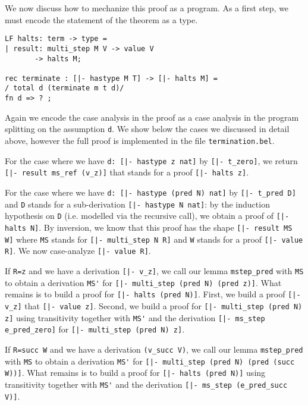 We now discuss how to mechanize this proof as a program. As a first step, we
must encode the statement of the theorem as a type.

\begin{lstlisting}
LF halts: term -> type =
| result: multi_step M V -> value V
       -> halts M;

rec terminate : [|- hastype M T] -> [|- halts M] =
/ total d (terminate m t d)/
fn d => ? ;
\end{lstlisting}

Again we encode the case analysis in the proof as a case analysis in the program
splitting on the assumption \lstinline!d!. We show below the cases we discussed
in detail above, however the full proof is implemented in the file
\lstinline!termination.bel!.

For the case where we have \lstinline!d: [|- hastype z nat]! by
\lstinline![|- t_zero]!, we return \lstinline![|- result ms_ref (v_z)]! that
stands for a proof \lstinline![|- halts z]!.

For the case where we have
\lstinline!d: [|- hastype (pred N) nat]! by \lstinline![|- t_pred D]! and
\lstinline!D! stands for a sub-derivation \lstinline![|- hastype N nat]!: by the
induction hypothesis on \lstinline!D! (i.e. modelled via the recursive call), we
obtain a proof of \lstinline![|- halts N]!.  By inversion, we know that this
proof has the shape \lstinline![|- result MS W]! where \lstinline!MS!
stands for \lstinline![|- multi_step N R]! and \lstinline!W!
stands for a proof \lstinline![|- value R]!. We now case-analyze
\mbox{\lstinline![|- value R]!}.

If \lstinline!R=z! and we have a derivation
\lstinline![|- v_z]!, we call our lemma \lstinline!mstep_pred! with
\lstinline!MS! to obtain a derivation \lstinline!MS'! for
\lstinline![|- multi_step (pred N) (pred z)]!. What remains is to build a proof
for \lstinline![|- halts (pred N)]!. First, we build a proof \lstinline![|- v_z]!
that \lstinline![|- value z]!. Second, we build a proof for
\lstinline![|- multi_step (pred N) z]! using transitivity together with
\lstinline!MS'! and the derivation \lstinline![|- ms_step e_pred_zero]! for
\mbox{\lstinline![|- multi_step (pred N) z]!}.

If \lstinline!R=succ W! and we have a derivation
\lstinline!(v_succ V)!, we call our lemma \lstinline!mstep_pred! with
\lstinline!MS! to obtain a derivation \lstinline!MS'! for
\lstinline![|- multi_step (pred N) (pred (succ W))]!. What remains is to build a proof
for \lstinline![|- halts (pred N)]! using transitivity together with
\lstinline!MS'! and the derivation
\lstinline![|- ms_step (e_pred_succ V)]!.

